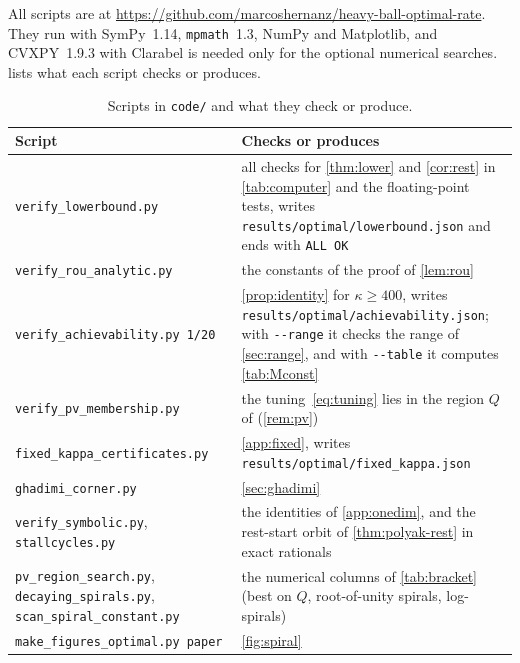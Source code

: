 \documentclass[11pt, a4paper]{article}
\newcommand{\file}{\nolinkurl}  %
\theoremstyle{definition}
\begin{document}
All scripts are at \url{https://github.com/marcoshernanz/heavy-ball-optimal-rate}. They run with SymPy~1.14,
\texttt{mpmath}~1.3, NumPy and Matplotlib, and CVXPY~1.9.3 with Clarabel is needed only for the optional numerical
searches.  lists what each script checks or produces.

\begin{table}[ht]
  \centering
  \caption{Scripts in \texttt{code/} and what they check or produce.}
  \label{tab:repro}
  \small
  \begin{tabular}{>{\raggedright\arraybackslash}p{5.3cm}>{\raggedright\arraybackslash}p{9.2cm}}
    \toprule
    Script & Checks or produces \\
    \midrule
    \file{verify_lowerbound.py} & all checks for \cref{thm:lower} and \cref{cor:rest} in \cref{tab:computer} and the
      floating-point tests, writes \file{results/optimal/lowerbound.json} and ends with \texttt{ALL OK} \\
    \file{verify_rou_analytic.py} & the constants of the proof of \cref{lem:rou} \\
    \file{verify_achievability.py}~\texttt{1/20} & \cref{prop:identity} for $\kappa\ge400$, writes
      \file{results/optimal/achievability.json}; with \texttt{-{}-range} it checks the range of \cref{sec:range}, and
      with \texttt{-{}-table} it computes \cref{tab:Mconst} \\
    \file{verify_pv_membership.py} & the tuning~\eqref{eq:tuning} lies in the region $Q$ of \citet{pasechniuk2026two}
      (\cref{rem:pv}) \\
    \file{fixed_kappa_certificates.py} & \cref{app:fixed}, writes \file{results/optimal/fixed_kappa.json} \\
    \file{ghadimi_corner.py} & \cref{sec:ghadimi} \\
    \file{verify_symbolic.py}, \file{stallcycles.py} & the identities of \cref{app:onedim}, and the rest-start orbit of
      \cref{thm:polyak-rest} in exact rationals \\
    \file{pv_region_search.py}, \file{decaying_spirals.py}, \file{scan_spiral_constant.py} & the numerical columns of
      \cref{tab:bracket} (best on $Q$, root-of-unity spirals, log-spirals) \\
    \file{make_figures_optimal.py}~\texttt{paper} & \cref{fig:spiral} \\
    \bottomrule
  \end{tabular}
\end{table}
\end{document}

